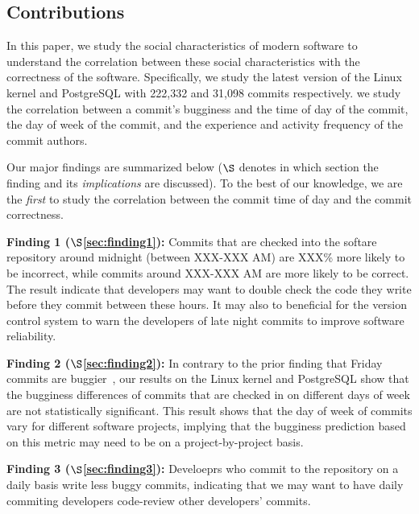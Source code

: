 \subsection{Contributions}
In this paper, we study the social characteristics of modern software to understand 
the correlation between these social characteristics with the correctness of the software.  
Specifically, we study the latest version of the Linux kernel and PostgreSQL with 222,332 and 31,098 commits respectively.
we study the correlation between a commit's bugginess
and the time of day of the commit, the day of week of the commit, and
the experience and activity frequency of the commit authors.

Our major findings 
are summarized below ($\S$ denotes in which
section the finding and its {\em implications} are discussed). To the best of our
knowledge, we are the {\em first} to study the correlation between the commit time of day and
the commit correctness. 

\begin{list}{}{\topsep=0pt\parsep=0pt\leftmargin=9pt\itemindent=0pt}

\vspace{0.05in}
\item {\bf Finding 1 ($\S$\ref{sec:finding1}):} 
Commits that are checked into the softare repository around midnight (between XXX-XXX AM) 
are XXX\% more likely to be incorrect, while commits around XXX-XXX AM are more likely to be correct.
The result indicate that developers may want to double check the code they write  
before they commit between these hours. It may also to beneficial for the version control
system to warn the developers of late night commits to improve software reliability. 

\item {\bf Finding 2 ($\S$\ref{sec:finding2}):} 
In contrary to the prior finding that Friday commits are buggier~\cite{2005-changes}, 
our results on the Linux kernel and PostgreSQL show that 
the bugginess differences of commits that are checked in on different days of week 
are not statistically significant. This result shows that the day of week of commits
vary for different software projects, implying that the bugginess prediction based on this 
metric may need to be on a project-by-project basis.

\item {\bf Finding 3 ($\S$\ref{sec:finding3}):} 
Develoeprs who commit to the repository on a daily basis
write less buggy commits, indicating that we may want to have daily
commiting developers code-review other developers' commits.

\end{list}


